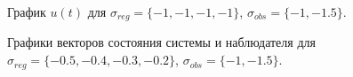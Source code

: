 \begin{figure}[!h]
	\caption{График $u(t)$ для $\sigma_{reg} = \{ -1, -1, -1, -1\}$, $\sigma_{obs}= \{-1, -1.5 \}$.}
	\label{3_u_k2l1}
\end{figure}

\begin{figure}[!h]
	\caption{Графики векторов состояния системы и наблюдателя для $\sigma_{reg} = \{ -0.5, -0.4, -0.3, -0.2\}$, $\sigma_{obs}= \{-1, -1.5 \}$.}
	\label{3_x_k3l1}
\end{figure}

